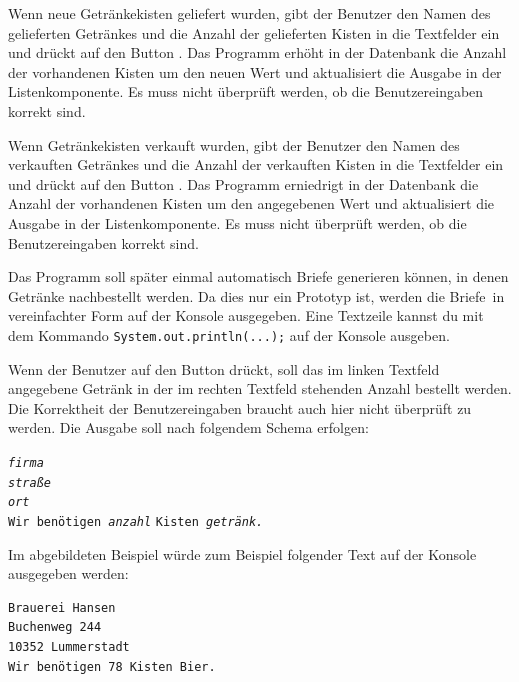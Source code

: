\begin{compactenum}[a)]
Wenn neue Getränkekisten geliefert wurden, gibt der Benutzer den Namen des
gelieferten Getränkes und die Anzahl der gelieferten Kisten in die Textfelder
ein und drückt auf den Button . Das Programm erhöht in der
Datenbank die Anzahl der vorhandenen Kisten um den neuen Wert und aktualisiert
die Ausgabe in der Listenkomponente. Es muss nicht überprüft werden, ob die
Benutzereingaben korrekt sind.

Wenn Getränkekisten verkauft wurden, gibt der Benutzer den Namen des verkauften
Getränkes und die Anzahl der verkauften Kisten in die Textfelder ein und drückt
auf den Button . Das Programm erniedrigt in der Datenbank die
Anzahl der vorhandenen Kisten um den angegebenen Wert und aktualisiert
die Ausgabe in der Listenkomponente. Es muss nicht überprüft werden, ob die
Benutzereingaben korrekt sind.

Das Programm soll später einmal automatisch Briefe generieren können, in denen
Getränke nachbestellt werden. Da dies nur ein Prototyp ist, werden die \glqq Briefe\grqq\
in vereinfachter Form auf der Konsole ausgegeben. Eine Textzeile kannst du mit
dem Kommando \lstinline|System.out.println(...);| auf der Konsole ausgeben.

Wenn der Benutzer auf den Button  drückt, soll das im
linken Textfeld angegebene Getränk in der im rechten Textfeld stehenden Anzahl
bestellt werden. Die Korrektheit der Benutzereingaben braucht auch hier nicht
überprüft zu werden. Die Ausgabe soll nach folgendem Schema erfolgen:

\smallskip

\texttt{\slshape{firma}\\
\slshape{straße}\\
\slshape{ort}}\\
\texttt{Wir benötigen \slshape{anzahl}} \texttt{Kisten \slshape{getränk}.}

\smallskip

Im abgebildeten Beispiel würde zum Beispiel folgender Text auf der Konsole
ausgegeben werden:

\smallskip

\begin{verbatim}
Brauerei Hansen
Buchenweg 244
10352 Lummerstadt
Wir benötigen 78 Kisten Bier.
\end{verbatim}

\smallskip


\end{compactenum}
